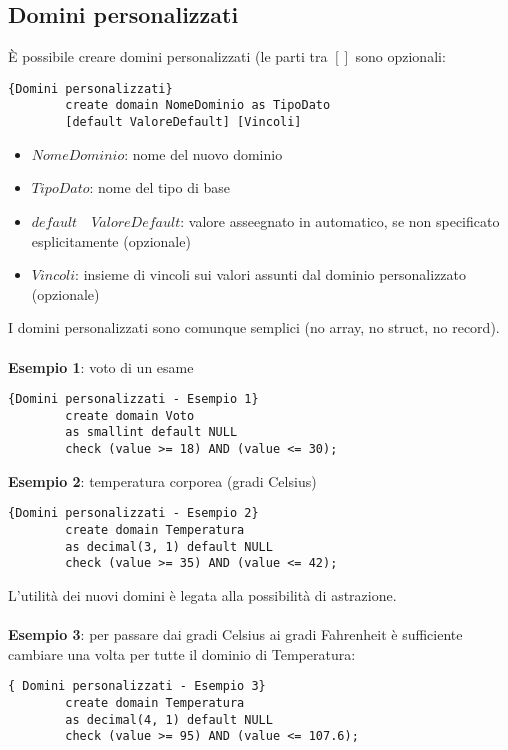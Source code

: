 \subsection{Domini personalizzati}
È possibile creare domini personalizzati (le parti tra $[]$ sono opzionali:
    \begin{lstlisting}{Domini personalizzati}
        create domain NomeDominio as TipoDato
        [default ValoreDefault] [Vincoli]
    \end{lstlisting}
    \begin{itemize}
        \item{$NomeDominio$: nome del nuovo dominio}
        \item{$TipoDato$: nome del tipo di base}
        \item{$default \quad ValoreDefault$: valore asseegnato in automatico, se non specificato esplicitamente (opzionale)}
        \item{$Vincoli$: insieme di vincoli sui valori assunti dal dominio personalizzato (opzionale)}
    \end{itemize}
I domini personalizzati sono comunque semplici (no array, no struct, no record).\\\\
\textbf{Esempio 1}: voto di un esame
    \begin{lstlisting}{Domini personalizzati - Esempio 1}
        create domain Voto
        as smallint default NULL
        check (value >= 18) AND (value <= 30);
    \end{lstlisting}
\textbf{Esempio 2}: temperatura corporea (gradi Celsius)
    \begin{lstlisting}{Domini personalizzati - Esempio 2}
        create domain Temperatura
        as decimal(3, 1) default NULL
        check (value >= 35) AND (value <= 42);
    \end{lstlisting}
L'utilità dei nuovi domini è legata alla possibilità di astrazione.\\\\
\textbf{Esempio 3}: per passare dai gradi Celsius ai gradi Fahrenheit è sufficiente cambiare una volta per tutte il dominio di Temperatura:
    \begin{lstlisting}{ Domini personalizzati - Esempio 3}
        create domain Temperatura
        as decimal(4, 1) default NULL
        check (value >= 95) AND (value <= 107.6);
    \end{lstlisting}

